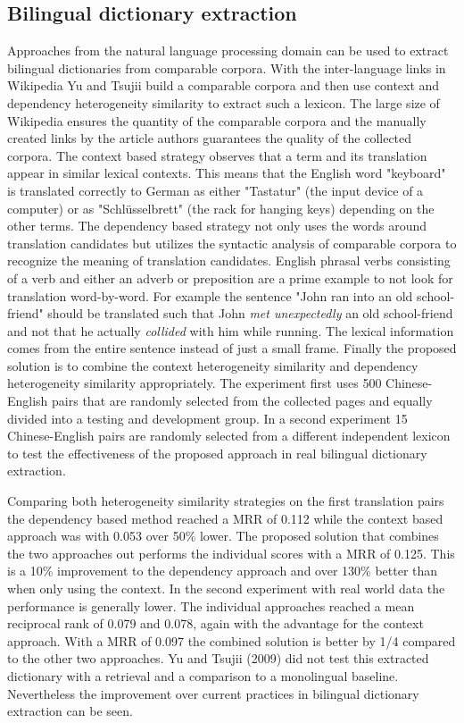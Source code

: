 \documentclass[journal]{IEEEtran}
\begin{document}
\subsection{Bilingual dictionary extraction}
Approaches from the natural language processing domain can be used to extract bilingual dictionaries from comparable corpora.
With the inter-language links in Wikipedia Yu and Tsujii \cite{yu09} build a comparable corpora and then use context and dependency heterogeneity similarity to extract such a lexicon.
The large size of Wikipedia ensures the quantity of the comparable corpora and the manually created links by the article authors guarantees the quality of the collected corpora.
The context based strategy observes that a term and its translation appear in similar lexical contexts.
This means that the English word "keyboard" is translated correctly to German as either "Tastatur" (the input device of a computer) or as "Schl\"usselbrett" (the rack for hanging keys) depending on the other terms.
The dependency based strategy not only uses the words around translation candidates but utilizes the syntactic analysis of comparable corpora to recognize the meaning of translation candidates.
English phrasal verbs consisting of a verb and either an adverb or preposition are a prime example to not look for translation word-by-word.
For example the sentence "John ran into an old school-friend" should be translated such that John \textit{met unexpectedly} an old school-friend and not that he actually \textit{collided} with him while running.
The lexical information comes from the entire sentence instead of just a small frame.
Finally the proposed solution is to combine the context heterogeneity similarity and dependency heterogeneity similarity appropriately.
The experiment first uses 500 Chinese-English pairs that are randomly selected from the collected pages and equally divided into a testing and development group.
In a second experiment 15 Chinese-English pairs are randomly selected from a different independent lexicon to test the effectiveness of the proposed approach in real bilingual dictionary extraction.

Comparing both heterogeneity similarity strategies on the first translation pairs the dependency based method reached a MRR of 0.112 while the context based approach was with 0.053 over 50\% lower.
The proposed solution that combines the two approaches out performs the individual scores with a MRR of 0.125.
This is a 10\% improvement to the dependency approach and over 130\% better than when only using the context.
In the second experiment with real world data the performance is generally lower.
The individual approaches reached a mean reciprocal rank of 0.079 and 0.078, again with the advantage for the context approach.
With a MRR of 0.097 the combined solution is better by 1/4 compared to the other two approaches.
Yu and Tsujii (2009) did not test this extracted dictionary with a retrieval and a comparison to a monolingual baseline.
Nevertheless the improvement over current practices in bilingual dictionary extraction can be seen.
\end{document}
